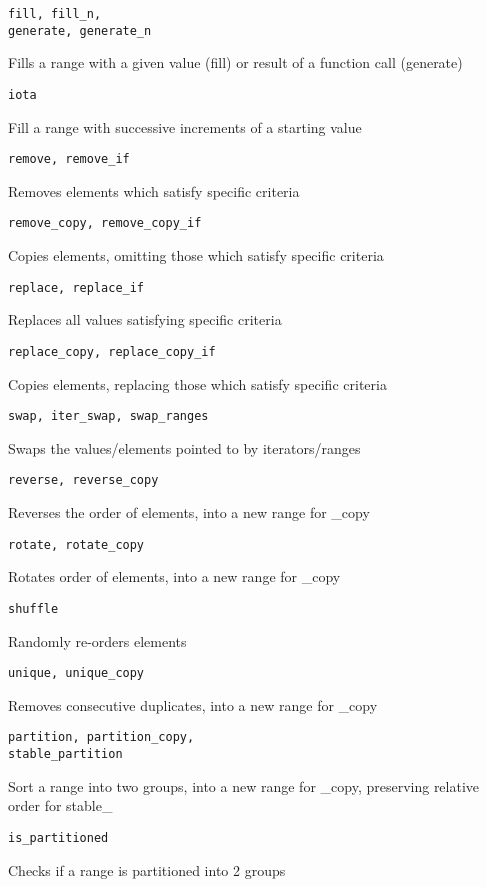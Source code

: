 \begin{multicols}{2}
\begin{lstlisting}
fill, fill_n,
generate, generate_n
\end{lstlisting}
Fills a range with a given value (fill) or result of a function call (generate)
\begin{lstlisting}
iota
\end{lstlisting}
Fill a range with successive increments of a starting value
\begin{lstlisting}
remove, remove_if
\end{lstlisting}
Removes elements which satisfy specific criteria
\begin{lstlisting}
remove_copy, remove_copy_if
\end{lstlisting}
Copies elements, omitting those which satisfy specific criteria
\begin{lstlisting}
replace, replace_if
\end{lstlisting}
Replaces all values satisfying specific criteria
\begin{lstlisting}
replace_copy, replace_copy_if
\end{lstlisting}
Copies elements, replacing those which satisfy specific criteria
\begin{lstlisting}
swap, iter_swap, swap_ranges
\end{lstlisting}
Swaps the values/elements pointed to by iterators/ranges
\begin{lstlisting}
reverse, reverse_copy
\end{lstlisting}
Reverses the order of elements, into a new range for \_copy
\begin{lstlisting}
rotate, rotate_copy
\end{lstlisting}
Rotates order of elements, into a new range for \_copy
\begin{lstlisting}
shuffle
\end{lstlisting}
Randomly re-orders elements
\begin{lstlisting}
unique, unique_copy
\end{lstlisting}
Removes consecutive duplicates, into a new range for \_copy
\begin{lstlisting}
partition, partition_copy,
stable_partition
\end{lstlisting}
Sort a range into two groups, into a new range for \_copy, preserving relative
order for stable\_
\begin{lstlisting}
is_partitioned
\end{lstlisting}
Checks if a range is partitioned into 2 groups
\begin{lstlisting}

\end{lstlisting}
\end{multicols}
